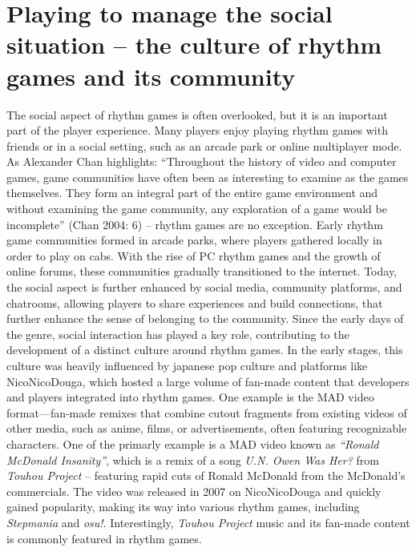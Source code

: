 \section{Playing to manage the social situation -- the culture of rhythm games and its community}
The social aspect of rhythm games is often overlooked, but it is an important part of the player experience. Many players enjoy playing rhythm games with friends or in a social setting, such as an arcade park or online multiplayer mode. As Alexander Chan highlights: ``Throughout the history of video and computer games, game communities have often been as interesting to examine as the games themselves. They form an integral part of the entire game environment and without examining the game community, any exploration of a game would be incomplete'' (Chan 2004: 6) \cite{arcadeculture} -- rhythm games are no exception. Early rhythm game communities formed in arcade parks, where players gathered locally in order to play on cabs. With the rise of PC rhythm games and the growth of online forums, these communities gradually transitioned to the internet. Today, the social aspect is further enhanced by social media, community platforms, and chatrooms, allowing players to share experiences and build connections, that further enhance the sense of belonging to the community. Since the early days of the genre, social interaction has played a key role, contributing to the development of a distinct culture around rhythm games. In the early stages, this culture was heavily influenced by japanese pop culture and platforms like NicoNicoDouga, which hosted a large volume of fan-made content that developers and players integrated into rhythm games. One example is the MAD video format—fan-made remixes that combine cutout fragments from existing videos of other media, such as anime, films, or advertisements, often featuring recognizable characters. One of the primarly example is a MAD video known as \textit{``Ronald McDonald Insanity''}, which is a remix of a song \textit{U.N. Owen Was Her?} from \textit{Touhou Project} -- featuring rapid cuts of Ronald McDonald from the McDonald’s commercials. The video was released in 2007 on NicoNicoDouga and quickly gained popularity, making its way into various rhythm games, including \textit{Stepmania} and \textit{osu!}. Interestingly, \textit{Touhou Project} music and its fan-made content is commonly featured in rhythm games.

